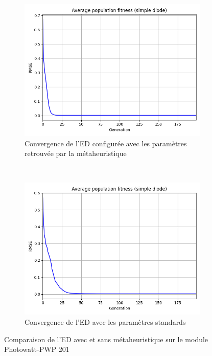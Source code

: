 \begin{figure}
    \centering
    \begin{subfigure}[b]{0.45\textwidth}
        \includegraphics[width=\textwidth]{resources/pwp/metafit.png}
        \caption{Convergence de l'ED configurée avec les paramètres retrouvée par la métaheuristique}
    \end{subfigure}
    ~
    \begin{subfigure}[b]{0.45\textwidth}
        \includegraphics[width=\textwidth]{resources/pwp/fitness.png}
        \caption{Convergence de l'ED avec les paramètres standards}
    \end{subfigure}
    \caption{Comparaison de l'ED avec et sans métaheuristique sur le module Photowatt-PWP 201}
    \label{fig:metaconv}
\end{figure}%
